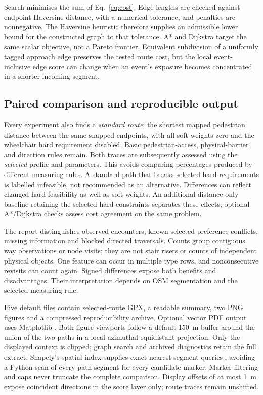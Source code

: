 \documentclass[preprint,12pt,a4paper]{elsarticle}
\begin{document}
Search minimises the sum of Eq.~\ref{eq:cost}. Edge lengths are checked against
endpoint Haversine distance, with a numerical tolerance, and penalties are
nonnegative. The Haversine heuristic therefore supplies an admissible lower
bound for the constructed graph to that tolerance. A* and Dijkstra target the
same scalar objective, not a Pareto frontier. Equivalent subdivision of a
uniformly tagged approach edge preserves the tested route cost, but the local
event-inclusive edge score can change when an event's exposure becomes
concentrated in a shorter incoming segment.

\subsection{Paired comparison and reproducible output}
\label{sec:comparison}
Every experiment also finds a \emph{standard route}: the shortest mapped
pedestrian distance between the same snapped endpoints, with all soft weights
zero and the wheelchair hard requirement disabled. Basic pedestrian-access,
physical-barrier and direction rules remain. Both traces are subsequently
assessed using the \emph{selected} profile and parameters. This avoids comparing
percentages produced by different measuring rules. A standard path that breaks
selected hard requirements is labelled infeasible, not recommended as an
alternative. Differences can reflect changed hard feasibility as well as soft
weights. An additional distance-only baseline retaining the selected hard
constraints separates these effects; optional A*/Dijkstra checks assess cost
agreement on the same problem.

The report distinguishes observed encounters, known selected-preference
conflicts, missing information and blocked directed traversals. Counts group
contiguous way observations or node visits; they are not stair risers or counts
of independent physical objects. One feature can occur in multiple type rows,
and nonconsecutive revisits can count again. Signed differences expose both
benefits and disadvantages. Their interpretation depends on OSM segmentation
and the selected measuring rule.

Five default files contain selected-route GPX, a readable summary, two PNG
figures and a compressed reproducibility archive. Optional vector PDF output
uses Matplotlib \cite{hunter2007}. Both figure viewports follow a default
150~m buffer around the union of the two paths in a local azimuthal-equidistant
projection. Only the displayed context is clipped; graph search and archived
diagnostics retain the full extract. Shapely's spatial index supplies exact
nearest-segment queries \cite{shapely}, avoiding a Python scan of every path
segment for every candidate marker. Marker filtering and caps never truncate
the complete comparison. Display offsets of at most 1~m expose coincident
directions in the score layer only; route traces remain unshifted.
\end{document}
